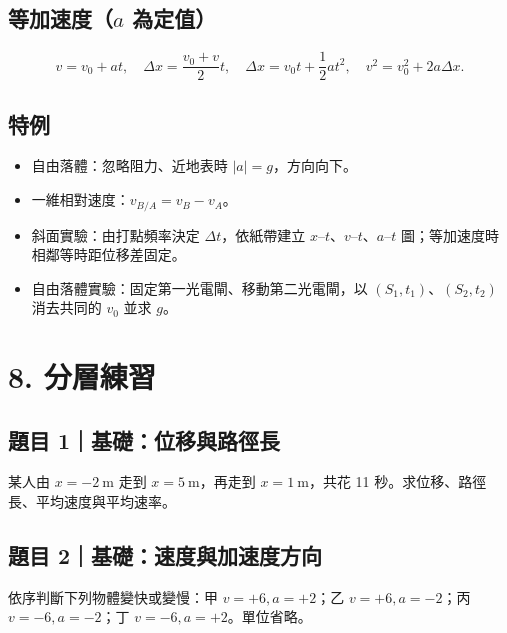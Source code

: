 \documentclass[11pt,a4paper]{article}
\providecommand{\tightlist}{%
  \setlength{\itemsep}{0pt}\setlength{\parskip}{0pt}}
\begin{document}
\subsection{\texorpdfstring{等加速度（\(a\) 為定值）}{等加速度（a 為定值）}}\label{ux7b49ux52a0ux901fux5ea6a-ux70baux5b9aux503c}

\[
v=v_0+at,
\quad
\Delta x=\frac{v_0+v}{2}t,
\quad
\Delta x=v_0t+\frac12at^2,
\quad
v^2=v_0^2+2a\Delta x.
\]

\subsection{特例}\label{ux7279ux4f8b}

\begin{itemize}
\tightlist
\item
  自由落體：忽略阻力、近地表時 \(|a|=g\)，方向向下。
\item
  一維相對速度：\(v_{B/A}=v_B-v_A\)。
\item
  斜面實驗：由打點頻率決定 \(\Delta t\)，依紙帶建立 \(x\text{–}t\)、\(v\text{–}t\)、\(a\text{–}t\) 圖；等加速度時相鄰等時距位移差固定。
\item
  自由落體實驗：固定第一光電閘、移動第二光電閘，以 \((S_1,t_1)\)、\((S_2,t_2)\) 消去共同的 \(v_0\) 並求 \(g\)。
\end{itemize}

\clearpage

\section{8. 分層練習}\label{ux5206ux5c64ux7df4ux7fd2}

\subsection{題目 1｜基礎：位移與路徑長}\label{ux984cux76ee-1ux57faux790eux4f4dux79fbux8207ux8defux5f91ux9577}

某人由 \(x=-2\ \mathrm{m}\) 走到 \(x=5\ \mathrm{m}\)，再走到 \(x=1\ \mathrm{m}\)，共花 11 秒。求位移、路徑長、平均速度與平均速率。

\subsection{題目 2｜基礎：速度與加速度方向}\label{ux984cux76ee-2ux57faux790eux901fux5ea6ux8207ux52a0ux901fux5ea6ux65b9ux5411}

依序判斷下列物體變快或變慢：甲 \(v=+6,a=+2\)；乙 \(v=+6,a=-2\)；丙 \(v=-6,a=-2\)；丁 \(v=-6,a=+2\)。單位省略。
\end{document}

